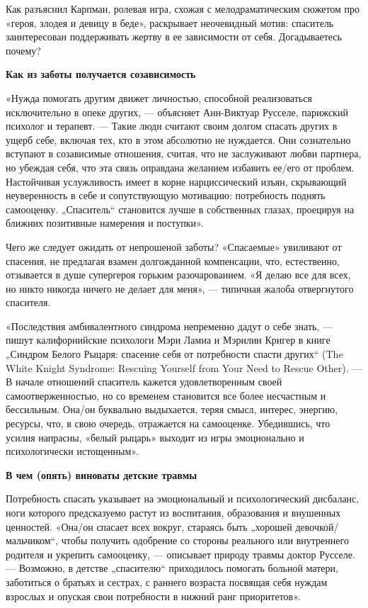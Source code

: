 Как разъяснил Карпман, ролевая игра, схожая с мелодраматическим сюжетом про «героя, злодея и девицу в беде», раскрывает неочевидный мотив: спаситель заинтересован поддерживать жертву в ее зависимости от себя. Догадываетесь почему?

\textbf{Как из заботы получается созависимость}

«Нужда помогать другим движет личностью, способной реализоваться исключительно в опеке других, — объясняет Анн-Виктуар Русселе, парижский психолог и терапевт. — Такие люди считают своим долгом спасать других в ущерб себе, включая тех, кто в этом абсолютно не нуждается. Они сознательно вступают в созависимые отношения, считая, что не заслуживают любви партнера, но убеждая себя, что эта связь оправдана желанием избавить ее/его от проблем. Настойчивая услужливость имеет в корне нарциссический изъян, скрывающий неуверенность в себе и сопутствующую мотивацию: потребность поднять самооценку. „Спаситель“ становится лучше в собственных глазах, проецируя на ближних позитивные намерения и поступки».

Чего же следует ожидать от непрошеной заботы? «Спасаемые» увиливают от спасения, не предлагая взамен долгожданной компенсации, что, естественно, отзывается в душе супергероя горьким разочарованием. «Я делаю все для всех, но никто никогда ничего не делает для меня», — типичная жалоба отвергнутого спасителя.

«Последствия амбивалентного синдрома непременно дадут о себе знать, — пишут калифорнийские психологи Мэри Ламиа и Мэрилин Кригер в книге „Синдром Белого Рыцаря: спасение себя от потребности спасти других“ (The White Knight Syndrome: Rescuing Yourself from Your Need to Rescue Other). — В начале отношений спаситель кажется удовлетворенным своей самоотверженностью, но со временем становится все более несчастным и бессильным. Она/он буквально выдыхается, теряя смысл, интерес, энергию, ресурсы, что, в свою очередь, отражается на самооценке. Убедившись, что усилия напрасны, «белый рыцарь» выходит из игры эмоционально и психологически истощенным».

\textbf{В чем (опять) виноваты детские травмы}

Потребность спасать указывает на эмоциональный и психологический дисбаланс, ноги которого предсказуемо растут из воспитания, образования и внушенных ценностей. «Она/он спасает всех вокруг, стараясь быть „хорошей девочкой/мальчиком“, чтобы получить одобрение со стороны реального или внутреннего родителя и укрепить самооценку, — описывает природу травмы доктор Русселе. — Возможно, в детстве „спасителю“ приходилось помогать больной матери, заботиться о братьях и сестрах, с раннего возраста посвящая себя нуждам взрослых и опуская свои потребности в нижний ранг приоритетов».

